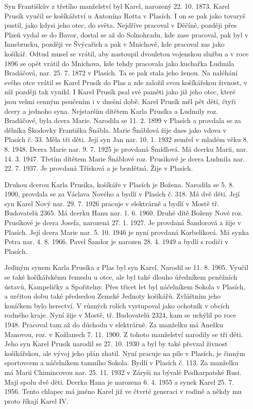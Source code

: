 \documentclass[../dejiny-rodu-prusiku.tex]{subfiles}
\begin{document}
Syn Františkův z třetího manželství byl Karel, narozený 22. 10. 1873. Karel Prusík vyučil se košíkářství u Anto­nína Rotta v Plasích. I on se pak jako tovaryš pustil, jako kdysi jeho otec, do světa. Nejdříve pracoval v Děčíně, později přes Plzeň vydal se do Bavor, dostal se až do Solnohradu, kde zase pracoval, pak byl v Innsbrucku, později ve Švýcařich a pak v Mnichově, kde pracoval zas jako košíkář. Odtud musel se vrátil, aby nastoupil dvouletou vojenskou službu a v roce 1896 se opět vrá­til do Mnichova, kde tehdy pracovala jako kuchařka Ludmila Bradáčová, nar. 25. 7. 1872 v Plasích. Ta se pak sta­la jeho ženou. Na naléhání svého otce vrátil se Karel Prusík do Plas a zde založil svou košíkářskou živnost, v níž později tak vynikl. I Karel Prusík psal své pamě­ti jako již jeho otec, které jsou velmi cenným poučením i v dnešní době. Karel Prusík měl pět dětí, čtyři dcery a jednoho syna. Nejstarším dítětem Karla Prusíka a Ludmily roz. Bradáčové, byla dcera Marie. Narodila se 11. 2. 1899 v Plasích a provdala se za dělníka Škodovky Františka Šnábla. Marie Šnáblová žije dnes jako vdova v Plasích č. 33. Měla tři děti. Její syn Jan nar. 10. 1. 1932 zemřel v mladém věku 8. 8. 1948. Dcera Marie nar. 9. 7. 1925 je provdaná Šmídlová. Má dcerku Marii, nar. 14. 3. 1947. Třetím dítětem Marie Šnáblové roz. Prusikové je dcera Ludmila nar. 22. 7. 1937. Je provdaná Třísková a je bezdětná. Žije v Plasích.

Druhou dcerou Karla Prusíka, košíkáře v Plasích je Božena. Narodila se 5. 8. 1900, provdala se za Václava Nového a bydlí v Plasích č. 318. Má dvě děti. Její syn Karel Nový nar. 29. 7. 1926 pracuje v elektrárně a bydlí v Mostě tř. Budovatelů 2365. Má dcerku Hanu nar. 1. 6. 1960. Druhé dítě Boženy Nové roz. Prusíkové je dcera Josefa, narozená 27. 1. 1927. Je provdaná Šandorová a žije v Pla­sích. Její dcera Marie nar. 5. 10. 1946 je nyní provdaná Korbelíková. Má synka Petra nar. 4. 8. 1966. Pavel Šandor je narozen 28. 4. 1949 a bydlí s rodiči v Plasích.

Jediným synem Karla Prusíka z Plas byl syn Karel. Narodil se 11. 8. 1905. Vyučil se také košíkářskému řemeslu u otce, ale byl také dlouho úředníkem peněžních ústavů, Kampeličky a Spořitelny. Přes třicet let byl náčelníkem Sokola v Plasích, a urči­tou dobu také předsedou Zemské Jednoty košíkářů. Zvláštním jeho koníčkem bylo herectví. V různých rolích vystupoval jako ochotník v obcích rodného kra­je. Nyní žije v Mostě, tř. Budovatelů 2324, kam se uchýlil po roce 1948. Pracoval tam až do důchodu v elektrárně. Za manželku má Anežku Manovou, roz. v Kožlanech 7. 11. 1900. Z tohoto manželství narodily se tři děti. Jeho syn Karel Prusík narodil se 27. 10. 1930 a byl by také převzal živnost košíkářskou, ale vývoj jeho plán zhatil. Nyní pracuje na pile v Plasích, je činným sportovcem a náčelníkem tamního Sokola. Bydlí v Plasích č. 113. Za manželku má Marii Chimincovou nar. 25. 11. 1932 v Záryši na bývalé Podkarpatské Rusi. Mají spolu dvě děti. Dcerka Hana je narozena 6. 4. 1955 a synek Karel 25. 7. 1956. Tento chlapec má jméno Karel již ve čtvrté generaci v rodině a někdy mu proto říkají Karel IV.
\end{document}
